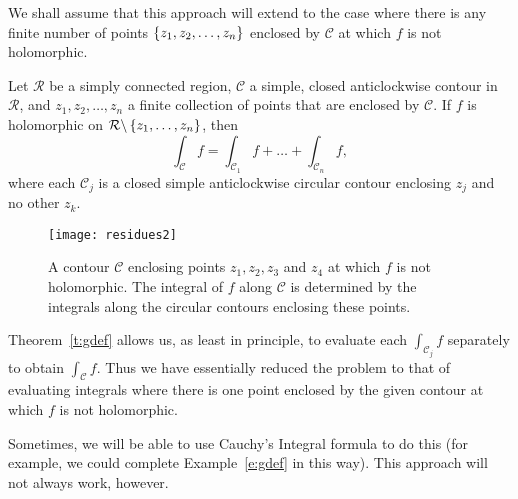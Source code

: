 \begin{comment}
\begin{example}
Let us use a similar approach to try to evaluate the integral
\[
\int_{-\infty}^{\infty} \frac{1}{(x^2+4)(x^2+9)}\ dx.
\]
\end{example}
This time, we use the same contour $\mathcal{C}_R = L_R+S_R$ and the function
\[
f(z) = \frac{1}{(z^2+4)(z^2+9)}
\]
which is holomorphic on $\C \backslash \set{ \pm 2i,\pm 3i }$ (thus we need to take $R>3$).
\begin{center}
\texttt{[image: semicircle5]}\\
\texttt{[image: semicircle6]} \\
\texttt{[image: semicircle7]}
\end{center}
\end{comment}

We shall assume that this approach will extend to the case where there is any finite number of points $\left\{z_1,z_2,\ldots,z_n\right\}$ enclosed by $\mathcal{C}$ at which $f$ is not holomorphic.
\begin{theorem}
\label{t:gdef}
Let $\mathcal{R}$ be a simply connected region, $\mathcal{C}$ a simple, closed anticlockwise contour in $\mathcal{R}$, and $z_1,z_2,\ldots,z_n$ a finite collection of points that are enclosed by $\mathcal{C}$.  If $f$ is holomorphic on $\mathcal{R} \backslash \left\{z_1,\ldots,z_n\right\}$, then 
\[
\int_{\mathcal{C}} f = \int_{\mathcal{C}_1}f+ \ldots + \int_{\mathcal{C}_n} f,
\]
where each $\mathcal{C}_j$ is a closed simple anticlockwise circular contour enclosing $z_j$ and no other $z_k$.
\end{theorem}

\begin{figure}[H]
\centering
\texttt{[image: residues2]}
\caption{A contour $\mathcal{C}$ enclosing points $z_1,z_2,z_3$ and $z_4$ at which $f$ is not holomorphic.  The integral of $f$ along $\mathcal{C}$ is determined by the integrals along the circular contours enclosing these points.}
\end{figure}

 Theorem~\ref{t:gdef} allows us, as least in principle, to evaluate each $\int_{\mathcal{C}_j} f$ separately to obtain $\int_{\mathcal{C}} f$.  Thus we have essentially reduced the problem to that of evaluating integrals where there is one point enclosed by the given contour at which $f$ is not holomorphic.  
 
  Sometimes, we will be able to use Cauchy's Integral formula to do this (for example, we could complete Example~\ref{e:gdef} in this way).  This approach will not always work, however.


